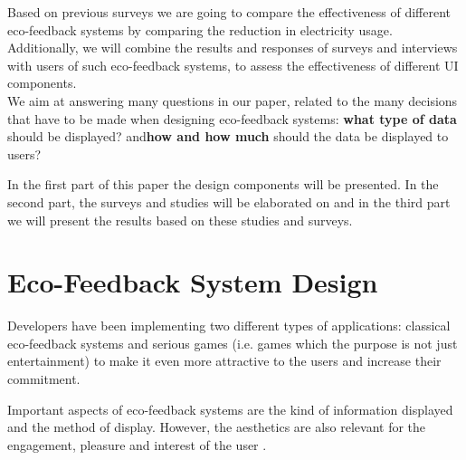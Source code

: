 \documentclass[journal]{vgtc}                %
\begin{document}
Based on previous surveys we are going to compare the effectiveness of different eco-feedback systems by comparing the reduction in electricity usage. %
Additionally, we will combine the results and responses of surveys and interviews with users of such eco-feedback systems, to assess the effectiveness of different UI components. \\

We aim at answering many questions in our paper, related to the many decisions that have to be made when designing eco-feedback systems: \textbf{what type of data} should be displayed? and\textbf{how and how much} should the data be displayed to users? 

In the first part of this paper the design components will be presented. In the second part, the surveys and studies will be elaborated on and in the third part we will present the results based on these studies and surveys. %


\section{Eco-Feedback System Design}
Developers have been implementing two different types of applications: classical eco-feedback systems and serious games (i.e. games which the purpose is not just entertainment)
to make it even more attractive to the users and increase their commitment.

Important aspects of eco-feedback systems are the kind of information displayed and the method of display. However, the aesthetics are also relevant for the engagement, pleasure and interest of the user \cite{bartram2015design}.
\end{document}
